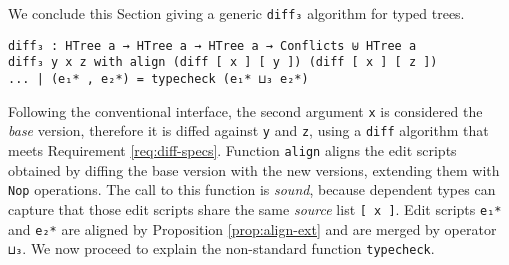 \documentclass{sigplanconf}
\theoremstyle{plain}
\newtheorem{prop}{Proposition}
\begin{document}

        

	We conclude this Section giving a generic \texttt{diff₃}
        algorithm for typed trees.
\begin{verbatim}
diff₃ : HTree a → HTree a → HTree a → Conflicts ⊎ HTree a
diff₃ y x z with align (diff [ x ] [ y ]) (diff [ x ] [ z ])
... | (e₁* , e₂*) = typecheck (e₁* ⊔₃ e₂*)
\end{verbatim}
	Following the conventional interface, the second argument
        \texttt{x} is considered the \emph{base} version, therefore it
        is diffed against \texttt{y} and \texttt{z}, using a
        \texttt{diff} algorithm that meets Requirement
        \ref{req:diff-specs}.
        Function \texttt{align} aligns the edit scripts obtained by
        diffing the base version with the new versions, extending them
        with \texttt{Nop} operations.
        The call to this function is \emph{sound}, because dependent
        types can capture that those edit scripts share the same
        \emph{source} list \texttt{[ x ]}.
        Edit scripts \texttt{e₁*} and \texttt{e₂*} are aligned by
        Proposition \ref{prop:align-ext} and are merged by operator
        \texttt{⊔₃}.
        We now proceed to explain the non-standard function
        \texttt{typecheck}.
        
\end{document}
